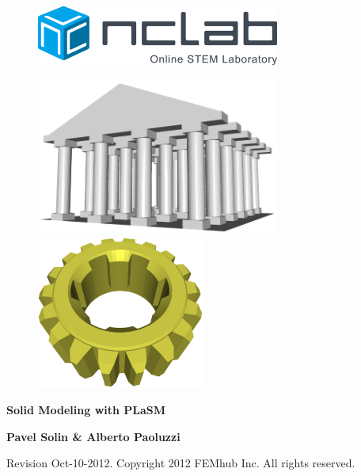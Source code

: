 \documentclass{article}
\newif\iffullversion
\begin{document}
\large

\vbox{}
\begin{figure}[!ht]
\includegraphics[width=8cm]{img/logo.png}
\vspace{18mm}
\end{figure}

\begin{figure}[!ht]
\begin{center}
\includegraphics[width=8cm]{img/plasm-temple.png}\hspace{1cm}
\includegraphics[width=5.5cm]{img/plasm-frontpage.png}
\vspace{15mm}
\end{center}
\end{figure}

\begin{center}
{\Huge \bf Solid Modeling with PLaSM}\\
\vbox{}
\vspace{1.4cm}
\iffullversion
\else
\centerline{\huge \color{red}{PREVIEW}}
\fi
\vfill
{\large
{\bf Pavel Solin \& Alberto Paoluzzi}
}
\end{center}
\vfill
\vfill
\begin{center}
Revision Oct-10-2012. Copyright 2012 FEMhub Inc. All rights reserved.
\end{center}
\newpage
\end{document}
